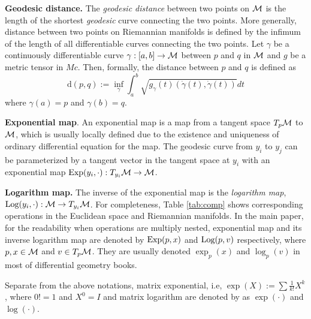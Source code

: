 \textbf{Geodesic distance.} The \textit{geodesic distance}
between two points on $\mathcal{M}$ is the length of the shortest {\em geodesic} curve connecting the two points. More generally, distance between two points on Riemannian manifolds is defined by the infimum of the length of all differentiable curves connecting the two points. Let $\gamma$ be a continuously differentiable curve $\gamma:[a,b] \rightarrow \mathcal{M}$ between $p$ and $q$ in $\mathcal{M}$ and $g$ be a metric tensor in $Mc$.
Then, formally, the distance between $p$ and $q$ is defined as
\begin{equation}
\text{d}(p,q) := \inf_\gamma \int_a^b \sqrt{g_\gamma(t) (\dot{\gamma}(t), \dot{\gamma}(t))} dt
\end{equation}
where $\gamma(a)=p$ and $\gamma(b)=q$.

\textbf{Exponential map}. An exponential map is a map from a tangent space $T_p\mathcal{M}$  to $\mathcal{M}$, which is usually locally defined due to the existence and uniqueness of ordinary differential equation for the map. The geodesic curve from $y_i$ to $y_j$ can be parameterized by a tangent vector in the tangent space at $y_i$ with an exponential map $\text{Exp}(y_i,\cdot ): T_{y_i}\mathcal{M} \rightarrow \mathcal{M}$. 


\textbf{Logarithm map.}
The inverse of the exponential map is the \textit{logarithm map}, $\text{Log}(y_i,\cdot):\mathcal{M} \rightarrow T_{y_i}\mathcal{M}$. 
For completeness, Table \ref{tab:comp} shows corresponding operations in the Euclidean space and Riemannian manifolds.
In the main paper, for the readability when operations are multiply nested, exponential map and its inverse logarithm map are denoted by $\text{Exp}(p, x)$ and $\text{Log}(p, v)$ respectively, where $p, x \in \mathcal{M}$ and $v\in T_p\mathcal{M}$. They are usually denoted $\exp_p(x)$ and $\log_p(v)$ in most of differential geometry books. 
 
Separate from the above notations, matrix exponential, i.e, $\exp(X):= \sum \frac{1}{k!} X^k$, where $0!=1$ and $X^0=I$  and matrix logarithm are denoted by as $\exp(\cdot)$ and $\log(\cdot)$. 


